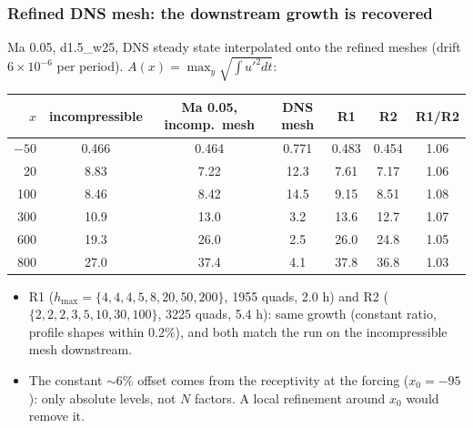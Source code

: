 \documentclass[
  aspectratio=169,
  t,
  onlytextwidth,
  10pt,
]{beamer}
\begin{document}
\begin{frame}
	\frametitle{Refined DNS mesh: the downstream growth is recovered}
	\small
	Ma 0.05, d1.5\_w25, DNS steady state interpolated onto the refined meshes (drift $6\times10^{-6}$ per period). $A(x)=\max_y\sqrt{\int u'^2dt}$:
	\begin{center}\footnotesize
		\renewcommand{\arraystretch}{1.1}
		\begin{tabular}{rcccccc}
			\toprule
			$x$ & incompressible & Ma 0.05, incomp.\ mesh & DNS mesh & R1 & R2 & R1/R2 \\
			\midrule
			$-50$ & 0.466 & 0.464 & 0.771 & 0.483 & 0.454 & 1.06 \\
			20    & 8.83  & 7.22  & 12.3  & 7.61  & 7.17  & 1.06 \\
			100   & 8.46  & 8.42  & 14.5  & 9.15  & 8.51  & 1.08 \\
			300   & 10.9  & 13.0  & 3.2   & 13.6  & 12.7  & 1.07 \\
			600   & 19.3  & 26.0  & 2.5   & 26.0  & 24.8  & 1.05 \\
			800   & 27.0  & 37.4  & 4.1   & 37.8  & 36.8  & 1.03 \\
			\bottomrule
		\end{tabular}
	\end{center}
	\begin{itemize}\footnotesize
		\item R1 ($h_{\max}=\{4,4,4,5,8,20,50,200\}$, 1955 quads, 2.0 h) and R2 ($\{2,2,2,3,5,10,30,100\}$, 3225 quads, 5.4 h): same growth (constant ratio, profile shapes within 0.2\%), and both match the run on the incompressible mesh downstream.
		\item The constant $\sim6\%$ offset comes from the receptivity at the forcing ($x_0=-95$): only absolute levels, not $N$ factors. A local refinement around $x_0$ would remove it.
	\end{itemize}
\end{frame}
\end{document}
